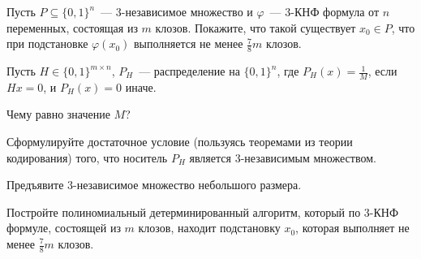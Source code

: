 \begin{enumtask}
    \item Пусть $P \subseteq \{0, 1\}^n$~--- $3$-независимое множество и $\varphi$~--- $3$-КНФ формула от $n$
	    переменных, состоящая из $m$ клозов. Покажите, что такой существует $x_0 \in P$, что при подстановке $\varphi(x_0)$
        выполняется не менее $\frac{7}{8}m$ клозов.
    \item Пусть $H \in \{0, 1\}^{m \times n}$, $P_H$~--- распределение на $\{0, 1\}^n$, где $P_H(x) = \frac{1}{M}$, если $H x
    	= 0$, и $P_H(x) = 0$ иначе.
        \begin{enumcyr}
            \item Чему равно значение $M$?
	        \item Сформулируйте достаточное условие (пользуясь теоремами из теории кодирования) того, что носитель $P_H$
    	        является $3$-независимым множеством.
            \item Предъявите $3$-независимое множество небольшого размера.
        \end{enumcyr}
    \item Постройте полиномиальный детерминированный алгоритм, который по $3$-КНФ формуле, состоящей из $m$ клозов, находит
	    подстановку $x_0$, которая выполняет не менее $\frac{7}{8}m$ клозов.
\end{enumtask}